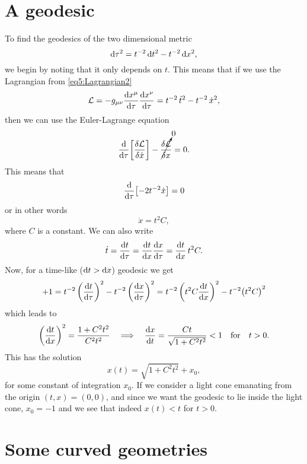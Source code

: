 \documentclass[11pt,a4paper, 
swedish, english %
]{article}
\begin{document}
\section{A geodesic}
To find the geodesics of the two dimensional metric
\begin{equation}
\mathrm{d}\tau^2=t^{-2}\,\mathrm{d}{t}^2 - t^{-2}\,\mathrm{d}{x}^2,
\end{equation}
we begin by noting that it only depends on $t$. This means that if we
use the Lagrangian from \eqref{eq5:Lagrangian2}
\begin{equation}
\mathcal{L}=-g_{\mu\nu}\dv{x^\mu}{\tau}\dv{x^\nu}{\tau}
=t^{-2}\,\dot{t}^2 - t^{-2}\,\dot{x}^2,
\end{equation}
then we can use the Euler-Lagrange equation
\begin{equation}
\dv{\tau}\qty[\frac{\delta\mathcal{L}}{\delta\dot{x}}]
-\cancelto{0}{\frac{\delta\mathcal{L}}{\delta{x}}}=0.
\end{equation}
This means that
\begin{equation}
\dv{\tau}\qty[-2t^{-2}\dot{x}]=0
\end{equation}
or in other words
\begin{equation}
\dot{x}=t^2C,
\end{equation}
where $C$ is a constant. We can also write
\begin{equation}
\dot{t}=\dv{t}{\tau}=\dv{t}{x}\dv{x}{\tau}
=\dv{t}{x}\,t^2C.
\end{equation}
Now, for a time-like ($\mathrm{d}{t}>\mathrm{d}{x}$) geodesic we get
\begin{equation}
+1=t^{-2}\,\qty(\dv{t}{\tau})^2
- t^{-2}\,\qty(\dv{x}{\tau})^2
=t^{-2}\,\qty(t^2C\dv{t}{x})^2
- t^{-2}\qty(t^2C)^2
\end{equation}
which leads to
\begin{equation}
\qty(\dv{t}{x})^2=\frac{1+C^2t^2}{C^2t^2}
\quad\Longrightarrow\quad
\dv{x}{t}=\frac{Ct}{\sqrt{1+C^2t^2}}<1\qfor t>0.
\end{equation}
This has the solution
\begin{equation}
x(t)=\sqrt{1+C^2t^2}+x_0,
\end{equation}
for some constant of integration $x_0$. If we consider a light cone
emanating from the origin $(t,x)=(0,0)$, and since we want the
geodesic to lie inside the light cone, $x_0=-1$ and we see that indeed
$x(t)<t$ for $t>0$.








\section{Some curved geometries}








\end{document}
